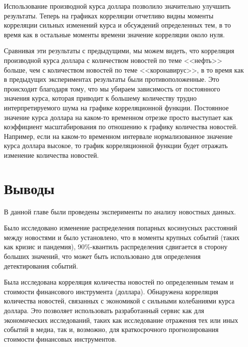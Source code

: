 Использование производной курса доллара позволило значительно улучшить результаты. Теперь на графиках корреляции отчетливо видны моменты корреляции сильных изменений курса и обсуждений определенных тем, в то время как в остальные моменты времени значение корреляции около нуля.

Сравнивая эти результаты с предыдущими, мы можем видеть, что корреляция производной курса доллара с количеством новостей по теме <<нефть>> больше, чем с количеством новостей по теме <<коронавирус>>, в то время как в предыдущих экспериментах результаты были противоположенные. Это происходит благодаря тому, что мы убираем зависимость от постоянного значения курса, которая приводит к большему количеству трудно интерпретируемого шума на графике корреляционной функции. Постоянное значение курса доллара на каком-то временном отрезке просто выступает как коэффициент масштабирования по отношению к графику количества новостей. Например, если на каком-то временном интервале нормализованное значение курса доллара высокое, то график корреляционной функции будет отражать изменение количества новостей.

\section{Выводы}

В данной главе были проведены эксперименты по анализу новостных данных.

Было исследовано изменение распределения попарных косинусных расстояний между новостями и было установлено, что в моменты крупных событий (таких как кризис и пандемия), 90\%-квантиль распределения сдвигается в сторону больших значений, что может быть использовано для определения детектирования событий.

Была исследована корреляция количества новостей по определенным темам и стоимости финансового инструмента (доллара). Обнаружена корреляция количества новостей, связанных с экономикой с сильными колебаниями курса доллара. Это позволяет использовать разработанный сервис как для экономических исследований, таких как исследование отражения тех или иных событий в медиа, так и, возможно, для краткосрочного прогнозирования стоимости финансовых инструментов.
